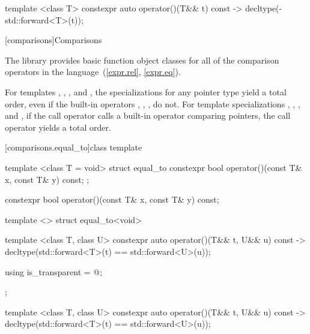 %
\begin{itemdecl}
template <class T> constexpr auto operator()(T&& t) const
    -> decltype(-std::forward<T>(t));
\end{itemdecl}

\begin{itemdescr}
\pnum\returns {}
\end{itemdescr}


[comparisons]{Comparisons}

\pnum
The library provides basic function object classes for all of the comparison
operators in the language~(\ref{expr.rel}, \ref{expr.eq}).

\pnum
For templates , , , and
, the specializations for any pointer type yield a total order,
even if the built-in operators \tcode{<}, \tcode{>}, \tcode{<=}, \tcode{>=}
do not.
For template specializations , ,
, and ,
if the call operator calls a built-in operator comparing pointers,
the call operator yields a total order.

[comparisons.equal_to]{class template }

%
\begin{itemdecl}
template <class T = void> struct equal_to {
  constexpr bool operator()(const T& x, const T& y) const;
};
\end{itemdecl}

%
\begin{itemdecl}
constexpr bool operator()(const T& x, const T& y) const;
\end{itemdecl}

\begin{itemdescr}
\pnum\returns {}
\end{itemdescr}

%
\begin{itemdecl}
template <> struct equal_to<void> {
  template <class T, class U> constexpr auto operator()(T&& t, U&& u) const
    -> decltype(std::forward<T>(t) == std::forward<U>(u));

  using is_transparent = @\unspec@;
};
\end{itemdecl}

%
\begin{itemdecl}
template <class T, class U> constexpr auto operator()(T&& t, U&& u) const
    -> decltype(std::forward<T>(t) == std::forward<U>(u));
\end{itemdecl}

